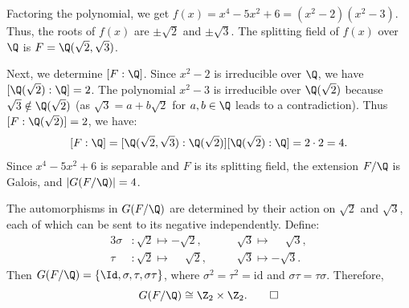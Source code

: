 \begin{solution}
  Factoring the polynomial, we get $f(x) = x^4 - 5x^2 + 6 = (x^2 - 2)(x^2 - 3)$. Thus, the roots of $f(x)$ are $\pm\sqrt{2}$ and $\pm\sqrt{3}$. The splitting field of $f(x)$ over $\Q$ is $F = \Q(\sqrt{2}, \sqrt{3})$.

  Next, we determine $[F : \Q]$. Since $x^2 - 2$ is irreducible over $\Q$, we have $[\Q(\sqrt{2}) : \Q] = 2$. The polynomial $x^2 - 3$ is irreducible over $\Q(\sqrt{2})$ because $\sqrt{3} \notin \Q(\sqrt{2})$ (as $\sqrt{3} = a + b\sqrt{2}$ for $a,b \in \Q$ leads to a contradiction). Thus $[F : \Q(\sqrt{2})] = 2$, we have:
  \[%
    [F : \Q] = [\Q(\sqrt{2}, \sqrt{3}) : \Q(\sqrt{2})][\Q(\sqrt{2}) : \Q] = 2 \cdot 2 = 4
  .\]%
  Since $x^4 - 5x^2 + 6$ is separable and $F$ is its splitting field, the extension $F/\Q$ is Galois, and $|G(F/\Q)| = 4$.

  The automorphisms in $G(F/\Q)$ are determined by their action on $\sqrt{2}$ and $\sqrt{3}$, each of which can be sent to its negative independently. Define:
  \begin{alignat*}{3}
    \sigma &: \sqrt{2} \mapsto -\sqrt{2},\quad&& \sqrt{3} \mapsto \phantom{-}\sqrt{3}, \\
    \tau   &: \sqrt{2} \mapsto \phantom{-}\sqrt{2},\quad&& \sqrt{3} \mapsto -\sqrt{3}
  .\end{alignat*}
  Then $G(F/\Q) = \{\Id, \sigma, \tau, \sigma\tau\}$, where $\sigma^2 = \tau^2 = \text{id}$ and $\sigma\tau = \tau\sigma$. Therefore,
  \[%
    G(F/\Q) \cong \Z_2 \times \Z_2
  .\qedhere\]%
\end{solution}
